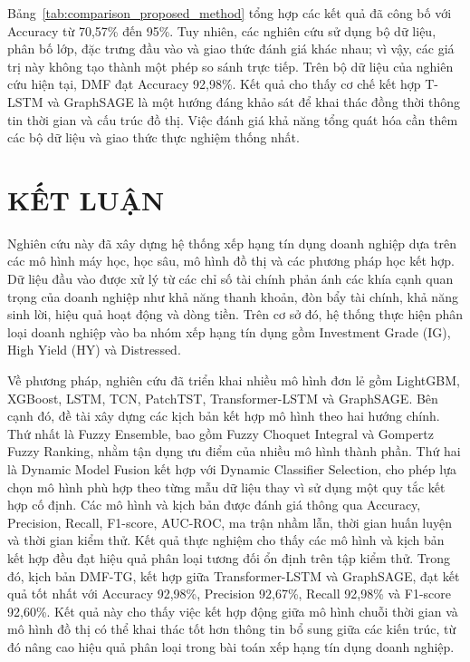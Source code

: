 \documentclass[10pt,twoside]{article}
\begin{document}
Bảng~\ref{tab:comparison_proposed_method} tổng hợp các kết quả đã công bố với Accuracy từ 70,57\% đến 95\%. Tuy nhiên, các nghiên cứu sử dụng bộ dữ liệu, phân bố lớp, đặc trưng đầu vào và giao thức đánh giá khác nhau; vì vậy, các giá trị này không tạo thành một phép so sánh trực tiếp. Trên bộ dữ liệu của nghiên cứu hiện tại, DMF đạt Accuracy 92,98\%. Kết quả cho thấy cơ chế kết hợp T-LSTM và GraphSAGE là một hướng đáng khảo sát để khai thác đồng thời thông tin thời gian và cấu trúc đồ thị. Việc đánh giá khả năng tổng quát hóa cần thêm các bộ dữ liệu và giao thức thực nghiệm thống nhất.

\section{KẾT LUẬN}
Nghiên cứu này đã xây dựng hệ thống xếp hạng tín dụng doanh nghiệp dựa trên các mô hình máy học, học sâu, mô hình đồ thị và các phương pháp học kết hợp. Dữ liệu đầu vào được xử lý từ các chỉ số tài chính phản ánh các khía cạnh quan trọng của doanh nghiệp như khả năng thanh khoản, đòn bẩy tài chính, khả năng sinh lời, hiệu quả hoạt động và dòng tiền. Trên cơ sở đó, hệ thống thực hiện phân loại doanh nghiệp vào ba nhóm xếp hạng tín dụng gồm Investment Grade (IG), High Yield (HY) và Distressed.

Về phương pháp, nghiên cứu đã triển khai nhiều mô hình đơn lẻ gồm LightGBM, XGBoost, LSTM, TCN, PatchTST, Transformer-LSTM và GraphSAGE. Bên cạnh đó, đề tài xây dựng các kịch bản kết hợp mô hình theo hai hướng chính. Thứ nhất là Fuzzy Ensemble, bao gồm Fuzzy Choquet Integral và Gompertz Fuzzy Ranking, nhằm tận dụng ưu điểm của nhiều mô hình thành phần. Thứ hai là Dynamic Model Fusion kết hợp với Dynamic Classifier Selection, cho phép lựa chọn mô hình phù hợp theo từng mẫu dữ liệu thay vì sử dụng một quy tắc kết hợp cố định. Các mô hình và kịch bản được đánh giá thông qua Accuracy, Precision, Recall, F1-score, AUC-ROC, ma trận nhầm lẫn, thời gian huấn luyện và thời gian kiểm thử. Kết quả thực nghiệm cho thấy các mô hình và kịch bản kết hợp đều đạt hiệu quả phân loại tương đối ổn định trên tập kiểm thử. Trong đó, kịch bản DMF-TG, kết hợp giữa Transformer-LSTM và GraphSAGE, đạt kết quả tốt nhất với Accuracy 92,98\%, Precision 92,67\%, Recall 92,98\% và F1-score 92,60\%. Kết quả này cho thấy việc kết hợp động giữa mô hình chuỗi thời gian và mô hình đồ thị có thể khai thác tốt hơn thông tin bổ sung giữa các kiến trúc, từ đó nâng cao hiệu quả phân loại trong bài toán xếp hạng tín dụng doanh nghiệp.
\end{document}
